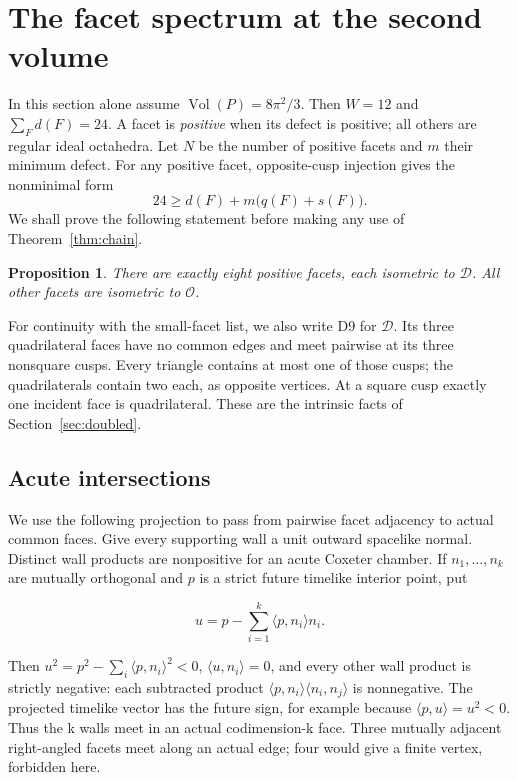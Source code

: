 \documentclass[11pt]{article}
\newtheorem{proposition}[theorem]{Proposition}
\theoremstyle{remark}
\newcommand{\Vol}{\operatorname{Vol}}
\newcommand{\OCT}{\mathcal O}
\newcommand{\DBL}{\mathcal D}
\begin{document}
\section{The facet spectrum at the second volume}\label{sec:equalityspectrum}
In this section alone assume $\Vol(P)=8\pi^2/3$. Then $W=12$ and
$\sum_Fd(F)=24$. A facet is \emph{positive} when its defect is
positive; all others are regular ideal octahedra. Let $N$ be the
number of positive facets and $m$ their minimum defect. For any
positive facet, opposite-cusp injection gives the nonminimal form
\begin{equation}\label{eq:equalitybudget}
 24\ge d(F)+m\bigl(q(F)+s(F)\bigr).
\end{equation}
We shall prove the following statement before making any use of
Theorem~\ref{thm:chain}.
\begin{proposition}\label{prop:equalityspectrum}
There are exactly eight positive facets, each isometric to $\DBL$.
All other facets are isometric to $\OCT$.
\end{proposition}
For continuity with the small-facet list, we also write D9 for
$\DBL$. Its three quadrilateral faces have no common edges and
meet pairwise at its three nonsquare cusps. Every triangle contains
at most one of those cusps; the quadrilaterals contain two each,
as opposite vertices. At a square cusp exactly one incident face
is quadrilateral. These are the intrinsic facts of
Section~\ref{sec:doubled}.

\subsection{Acute intersections}


We use the following projection to pass from pairwise facet adjacency to actual common faces. Give every supporting wall a unit outward spacelike normal. Distinct wall products are nonpositive for an acute Coxeter chamber. If \(n_1,\dots,n_k\) are mutually orthogonal and \(p\) is a strict future timelike interior point, put

\[
 u=p-\sum_{i=1}^k\langle p,n_i\rangle n_i.
\]

Then \(u^2=p^2-\sum_i\langle p,n_i\rangle^2<0\), \(\langle u,n_i\rangle=0\), and every other wall product is strictly negative: each subtracted product \(\langle p,n_i\rangle\langle n_i,n_j\rangle\) is nonnegative. The projected timelike vector has the future sign, for example because \(\langle p,u\rangle=u^2<0\). Thus the k walls meet in an actual codimension-k face. Three mutually adjacent right-angled facets meet along an actual edge; four would give a finite vertex, forbidden here.
\end{document}
